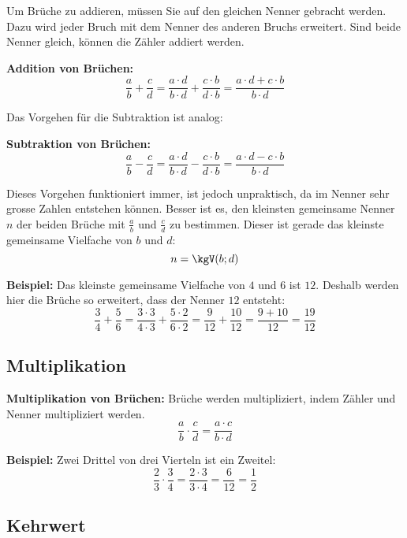 Um Brüche zu addieren, müssen Sie auf den gleichen Nenner gebracht werden. Dazu wird jeder Bruch mit dem Nenner des anderen Bruchs erweitert. Sind beide Nenner gleich, können die Zähler addiert werden.
\begin{theorem}
  \textbf{Addition von Brüchen:}
  \[
    \frac{a}{b}+\frac{c}{d} = \frac{a\cdot d}{b\cdot d}+\frac{c\cdot b}{d\cdot b} = \frac{a\cdot d+c\cdot b}{b\cdot d}
  \]
\end{theorem}
Das Vorgehen für die Subtraktion ist analog:
\begin{theorem}
  \textbf{Subtraktion von Brüchen:}
  \[
    \frac{a}{b}-\frac{c}{d} = \frac{a\cdot d}{b\cdot d}-\frac{c\cdot b}{d\cdot b} = \frac{a\cdot d-c\cdot b}{b\cdot d}
  \]
\end{theorem}
Dieses Vorgehen funktioniert immer, ist jedoch unpraktisch, da im Nenner sehr grosse Zahlen entstehen können. Besser ist es, den kleinsten gemeinsame Nenner $n$ der beiden Brüche mit $\frac{a}{b}$ und $\frac{c}{d}$ zu bestimmen. Dieser ist gerade das kleinste gemeinsame Vielfache von $b$ und $d$:
\[
  n = \kgV(b;d)
\]
\begin{example}
  \textbf{Beispiel:} Das kleinste gemeinsame Vielfache von $4$ und $6$ ist $12$. Deshalb werden hier die Brüche so erweitert, dass der Nenner $12$ entsteht:
  \[
    \frac{3}{4}+\frac{5}{6} = \frac{3\cdot 3}{4\cdot 3}+\frac{5\cdot 2}{6\cdot 2} = \frac{9}{12}+\frac{10}{12} = \frac{9+10}{12} = \frac{19}{12}
  \]
\end{example}

\subsection{Multiplikation}

\begin{theorem}
  \textbf{Multiplikation von Brüchen:} Brüche werden multipliziert, indem Zähler und Nenner multipliziert werden.
  \[
    \frac{a}{b}\cdot\frac{c}{d} = \frac{a\cdot c}{b\cdot d}
  \]
\end{theorem}
\begin{example}
  \textbf{Beispiel:} Zwei Drittel von drei Vierteln ist ein Zweitel:
  \[
    \frac{2}{3}\cdot\frac{3}{4} = \frac{2\cdot 3}{3\cdot 4} = \frac{6}{12} = \frac{1}{2}
  \]
\end{example}

\subsection{Kehrwert}

